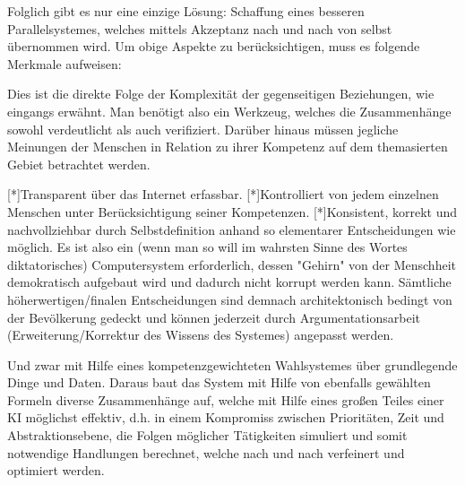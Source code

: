 Folglich gibt es nur eine einzige Lösung: Schaffung eines besseren Parallelsystemes, welches mittels Akzeptanz nach und nach von selbst übernommen wird. Um obige Aspekte zu berücksichtigen, muss es folgende Merkmale aufweisen:

Dies ist die direkte Folge der Komplexität der gegenseitigen Beziehungen, wie eingangs erwähnt. Man benötigt also ein Werkzeug, welches die Zusammenhänge sowohl verdeutlicht als auch verifiziert. Darüber hinaus müssen jegliche Meinungen der Menschen in Relation zu ihrer Kompetenz auf dem themasierten Gebiet betrachtet werden.

[*]Transparent über das Internet erfassbar.
[*]Kontrolliert von jedem einzelnen Menschen unter Berücksichtigung seiner Kompetenzen.
[*]Konsistent, korrekt und nachvollziehbar durch Selbstdefinition anhand so elementarer Entscheidungen wie möglich. Es ist also ein (wenn man so will im wahrsten Sinne des Wortes diktatorisches) Computersystem erforderlich, dessen "Gehirn" von der Menschheit demokratisch aufgebaut wird und dadurch nicht korrupt werden kann. Sämtliche höherwertigen/finalen Entscheidungen sind demnach architektonisch bedingt von der Bevölkerung gedeckt und können jederzeit durch Argumentationsarbeit (Erweiterung/Korrektur des Wissens des Systemes) angepasst werden.

Und zwar mit Hilfe eines kompetenzgewichteten Wahlsystemes über grundlegende Dinge und Daten. Daraus baut das System mit Hilfe von ebenfalls gewählten Formeln diverse Zusammenhänge auf, welche mit Hilfe eines großen Teiles einer KI möglichst effektiv, d.h. in einem Kompromiss zwischen Prioritäten, Zeit und Abstraktionsebene, die Folgen möglicher Tätigkeiten simuliert und somit notwendige Handlungen berechnet, welche nach und nach verfeinert und optimiert werden.